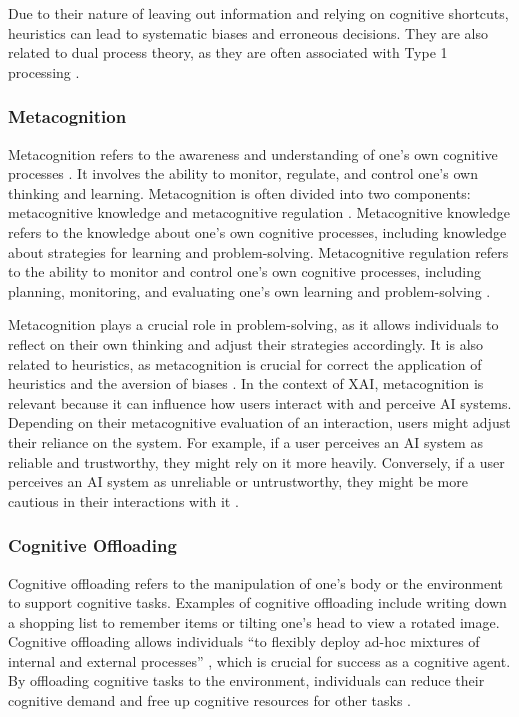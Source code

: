 Due to their nature of leaving out information and relying on cognitive shortcuts, heuristics can lead to systematic biases and erroneous decisions. They are also related to dual process theory, as they are often associated with Type 1 processing \parencite{Evans2013}.

\subsubsection{Metacognition} \label{sssec:metacognition}

Metacognition refers to the awareness and understanding of one's own cognitive processes \parencite{Flavell1979}. It involves the ability to monitor, regulate, and control one's own thinking and learning. Metacognition is often divided into two components: metacognitive knowledge and metacognitive regulation \parencite{Schraw2006}. Metacognitive knowledge refers to the knowledge about one's own cognitive processes, including knowledge about strategies for learning and problem-solving. Metacognitive regulation refers to the ability to monitor and control one's own cognitive processes, including planning, monitoring, and evaluating one's own learning and problem-solving \parencite{Cross1988}.

Metacognition plays a crucial role in problem-solving, as it allows individuals to reflect on their own thinking and adjust their strategies accordingly. It is also related to heuristics, as metacognition is crucial for correct the application of heuristics and the aversion of biases \parencite{Koriat2010}. In the context of \ac{XAI}, metacognition is relevant because it can influence how users interact with and perceive AI systems. Depending on their metacognitive evaluation of an interaction, users might adjust their reliance on the system. For example, if a user perceives an AI system as reliable and trustworthy, they might rely on it more heavily. Conversely, if a user perceives an AI system as unreliable or untrustworthy, they might be more cautious in their interactions with it \parencite{Jussupow2021, Shin2021}.

\subsubsection{Cognitive Offloading} \label{sssec:cognitive_offloading}

Cognitive offloading refers to the manipulation of one's body or the environment to support cognitive tasks. Examples of cognitive offloading include writing down a shopping list to remember items or tilting one's head to view a rotated image. Cognitive offloading allows individuals “to flexibly deploy ad-hoc mixtures of internal and external processes” \parencite{Risko2016}, which is crucial for success as a cognitive agent. By offloading cognitive tasks to the environment, individuals can reduce their cognitive demand and free up cognitive resources for other tasks \parencite{Risko2016}.

